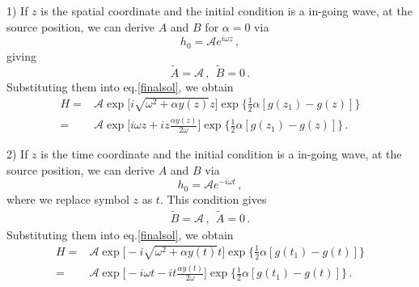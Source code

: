 \documentclass[
 jor,
 amsmath,amssymb,preprint,
]{revtex4-2}
\begin{document}
1) If $z$ is the spatial coordinate and the initial condition is a in-going wave, at the source position, we can derive $A$ and $B$ for $\alpha=0$ via
\begin{equation}
h_0 = \mathcal{A} e^{i\omega z}\,,
\end{equation}
giving
\begin{equation}
\tilde{A} = \mathcal{A}\,,~~\tilde{B} = 0\,.
\end{equation}
Substituting them into eq.\eqref{finalsol}, we obtain
\begin{equation}
\begin{aligned}
H = & \mathcal{A} \exp\bigg[i\sqrt{\omega^2 + \alpha y(z)} z\bigg] \exp\bigg\{ \frac{1}{2}\alpha [g(z_1)-g(z)] \bigg\} \\
= & \mathcal{A} \exp\bigg[i\omega z + i z\frac{\alpha y(z)}{2\omega} \bigg] \exp\bigg\{ \frac{1}{2}\alpha [g(z_1)-g(z)] \bigg\} \,.
\label{sptsol}
\end{aligned}
\end{equation}

2) If $z$ is the time coordinate and the initial condition is a in-going wave, at the source position, we can derive $A$ and $B$ via
\begin{equation}
h_0 = \mathcal{A} e^{-i\omega t}\,,
\end{equation}
where we replace symbol $z$ as $t$. This condition gives 
\begin{align}
\tilde{B} = \mathcal{A}\,,~~\tilde{A} = 0\,.
\end{align}
Substituting them into eq.\eqref{finalsol}, we obtain
\begin{equation}
\begin{aligned}
H = & \mathcal{A} \exp\bigg[-i\sqrt{\omega^2 + \alpha y(t)} t\bigg] \exp\bigg\{ \frac{1}{2}\alpha [g(t_1)-g(t)] \bigg\} \\
= & \mathcal{A} \exp\bigg[-i\omega t - i t\frac{\alpha y(t)}{2\omega} \bigg] \exp\bigg\{ \frac{1}{2}\alpha [g(t_1)-g(t)] \bigg\} \,.
\label{lapsol}
\end{aligned}
\end{equation}











\end{document}
